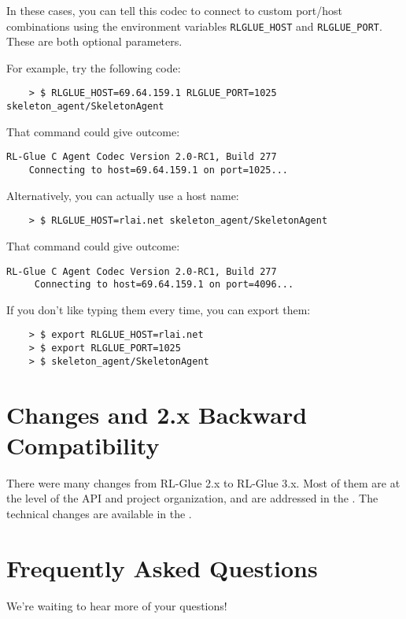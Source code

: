 \documentclass[11pt]{article}
\begin{document}
In these cases, you can tell this codec to connect to custom port/host combinations using the environment
variables \texttt{RLGLUE\_HOST} and \texttt{RLGLUE\_PORT}.  These are both optional parameters.

For example, try the following code:
\begin{verbatim}
	> $ RLGLUE_HOST=69.64.159.1 RLGLUE_PORT=1025 skeleton_agent/SkeletonAgent 
\end{verbatim}

That command could give outcome:
\begin{verbatim}
RL-Glue C Agent Codec Version 2.0-RC1, Build 277
    Connecting to host=69.64.159.1 on port=1025...
\end{verbatim}

Alternatively, you can actually use a host name:
\begin{verbatim}
	> $ RLGLUE_HOST=rlai.net skeleton_agent/SkeletonAgent 
\end{verbatim}

That command could give outcome:
\begin{verbatim}
RL-Glue C Agent Codec Version 2.0-RC1, Build 277
     Connecting to host=69.64.159.1 on port=4096...
\end{verbatim}

If you don't like typing them every time, you can export them:
\begin{verbatim}
	> $ export RLGLUE_HOST=rlai.net
	> $ export RLGLUE_PORT=1025
	> $ skeleton_agent/SkeletonAgent 
\end{verbatim}




\section{Changes and 2.x Backward Compatibility}
There were many changes from RL-Glue 2.x to RL-Glue 3.x.  Most of them are at the level of the API and project organization, and are addressed in the .  The technical changes are available in the .



\section{Frequently Asked Questions}
We're waiting to hear more of your questions!
\end{document}
